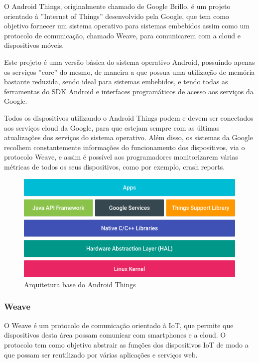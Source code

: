 O Android Things, originalmente chamado de Google Brillo, é um projeto orientado à ''Internet of Things'' desenvolvido pela Google, que tem como objetivo fornecer um sistema operativo para sistemas embebidos assim como um protocolo de comunicação, chamado Weave, para comunicarem com a cloud e dispositivos móveis.

Este projeto é uma versão básica do sistema operativo Android, possuindo apenas os serviços ''core'' do mesmo, de maneira a que possua uma utilização de memória bastante reduzida, sendo ideal para sistemas embebidos, e tendo todas as ferramentas do SDK Android e interfaces programáticos de acesso aos serviços da Google.

Todos os dispositivos utilizando o Android Things podem e devem ser conectados aos serviços cloud da Google, para que estejam sempre com as últimas atualizações dos serviços do sistema operativo. Além disso, os sistemas da Google recolhem constantemente informações do funcionamento dos dispositivos, via o protocolo Weave, e assim é possível aos programadores monitorizarem várias métricas de todos os seus dispositivos, como por exemplo, crash reports.

\begin{figure}[H]
  \centering
        \includegraphics[scale=0.5]{img/platform-architecture-and-things.png}
  \caption{Arquitetura base do Android Things}
\end{figure}

\subsubsection{Weave}

O Weave é um protocolo de comunicação orientado à IoT, que permite que dispositivos desta área possam comunicar com smartphones e a cloud. O protocolo tem como objetivo abstrair as funções dos dispositivos IoT de modo a que possam ser reutilizado por várias aplicações e serviços web.


